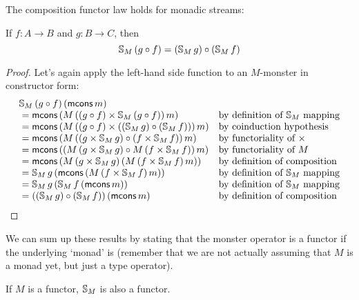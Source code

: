 \begin{lemma}\label{lemma:functor_comp}
The composition functor law holds for monadic streams:

If $f:A\rightarrow B$ and $g:B\rightarrow C$, then
$$
\mathbb{S}_{M}\,(g\circ f) = (\mathbb{S}_{M}\,g) \circ (\mathbb{S}_{M}\,f)
$$
\end{lemma}
\begin{proof}
Let's again apply the left-hand side function to an $M$-monster in constructor form:
$$
\begin{array}{ll}
\mathbb{S}_{M}\,(g\circ f)\,(\mathsf{mcons}\,m)\\
{}= \mathsf{mcons}\,(M\,((g\circ f)\times \mathbb{S}_{M}\,(g\circ f))\,m)
  & \mbox{by definition of }\mathbb{S}_{M}\mbox{ mapping}\\
{}= \mathsf{mcons}\,(M\,((g\circ f)\times ((\mathbb{S}_{M}\,g) \circ (\mathbb{S}_{M}\,f)))\,m)
  & \mbox{by coinduction hypothesis}\\ 
{}= \mathsf{mcons}\,(M\,((g\times \mathbb{S}_{M}\,g) \circ (f\times \mathbb{S}_{M}\,f))\,m)
  & \mbox{by functoriality of }\times\\ 
{}= \mathsf{mcons}\,((M\,(g\times \mathbb{S}_{M}\,g) \circ M\,(f\times \mathbb{S}_{M}\,f))\,m)
  & \mbox{by functoriality of }M\\ 
{}= \mathsf{mcons}\,(M\,(g\times \mathbb{S}_{M}\,g)\, (M\,(f\times \mathbb{S}_{M}\,f)\,m))
  & \mbox{by definition of composition}\\ 
{}= \mathbb{S}_{M}\,g\, (\mathsf{mcons}\,(M\,(f\times \mathbb{S}_{M}\,f)\,m))
  & \mbox{by definition of }\mathbb{S}_{M}\mbox{ mapping}\\ 
{}= \mathbb{S}_{M}\,g\, (\mathbb{S}_{M}\,f\,(\mathsf{mcons}\,m))
  & \mbox{by definition of }\mathbb{S}_{M}\mbox{ mapping}\\ 
{}= ((\mathbb{S}_{M}\,g) \circ (\mathbb{S}_{M}\,f))\,(\mathsf{mcons}\,m)
  & \mbox{by definition of composition}
\end{array}
$$
\end{proof}

We can sum up these results by stating that the monster operator is a functor if the underlying `monad' is (remember that we are not actually assuming that $M$ is a monad yet, but just a type operator).

\begin{theorem}
If $M$ is a functor, $\mathbb{S}_{M}$ is also a functor.
\end{theorem}
